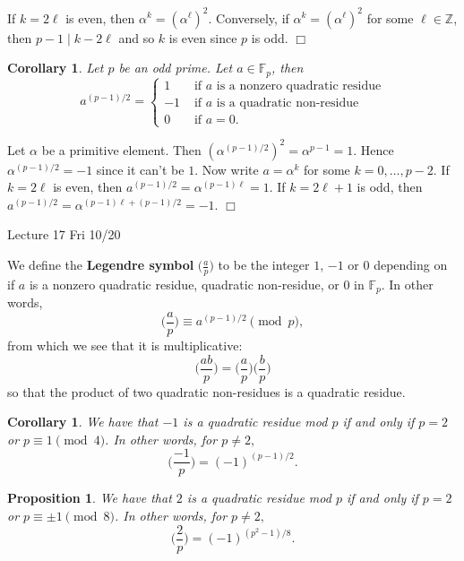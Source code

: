 \documentclass{article}
\def\Z{{\mathbb Z}}
\def\F{{\mathbb F}}
\def\Z{{\mathbb Z}}
\def\F{{\mathbb F}}
\newtheorem{cor}[subsection]{Corollary}
\newtheorem{proposition}[subsection]{Proposition}
\newenvironment{proof}{\noindent {\bf Proof:}}{$\Box$ \vspace{2 ex}}
\newcommand{\add}[1]{{\color{blue} #1}}
\renewcommand{\lg}[2]{\Big(\frac{#1}{#2}\Big)}
\begin{document}
\begin{proof}
    If $k = 2\ell$ is even, then $\alpha^k = (\alpha^\ell)^2$. Conversely, if $\alpha^k = (\alpha^\ell)^2$ for some $\ell\in\Z$, then $p - 1 \mid k - 2\ell$ and so $k$ is even since $p$ is odd.
\end{proof}

\begin{cor}
    Let $p$ be an odd prime. Let $a\in\F_p$, then
    $$a^{(p-1)/2} = \begin{cases}
        1&\mbox{ if }a\mbox{ is a nonzero quadratic residue}\\
        -1&\mbox{ if }a\mbox{ is a quadratic non-residue}\\
        0&\mbox{ if }a = 0.
    \end{cases}$$
\end{cor}

\begin{proof}
    Let $\alpha$ be a primitive element. Then $(\alpha^{(p-1)/2})^2 = \alpha^{p-1} = 1$. Hence $\alpha^{(p-1)/2} = -1$ since it can't be $1$. Now write $a = \alpha^k$ for some $k = 0,\ldots,p-2$. If $k = 2\ell$ is even, then $a^{(p-1)/2} = \alpha^{(p-1)\ell} = 1$. If $k = 2\ell+1$ is odd, then $a^{(p-1)/2} = \alpha^{(p-1)\ell + (p-1)/2} = -1$.
\end{proof}

\begin{center}
    \add{Lecture 17 Fri 10/20}
\end{center}

We define the \textbf{Legendre symbol} $\displaystyle\lg{a}{p}$ to be the integer $1$, $-1$ or $0$ depending on if $a$ is a nonzero quadratic residue, quadratic non-residue, or $0$ in $\F_p$. In other words, $$\lg{a}{p} \equiv a^{(p-1)/2}\pmod{p},$$
from which we see that it is multiplicative:
$$\lg{ab}{p} = \lg{a}{p}\lg{b}{p}$$
so that the product of two quadratic non-residues is a quadratic residue.

\begin{cor}
    We have that $-1$ is a quadratic residue mod $p$ if and only if $p = 2$ or $p\equiv 1\pmod{4}$. In other words, for $p\neq 2,$ $$\lg{-1}{p} = (-1)^{(p-1)/2}.$$
\end{cor}

\begin{proposition}\label{prop:2p}
    We have that $2$ is a quadratic residue mod $p$ if and only if $p = 2$ or $p\equiv \pm1\pmod{8}$. In other words, for $p\neq 2,$ $$\lg{2}{p} = (-1)^{(p^2-1)/8}.$$
\end{proposition}
\end{document}
